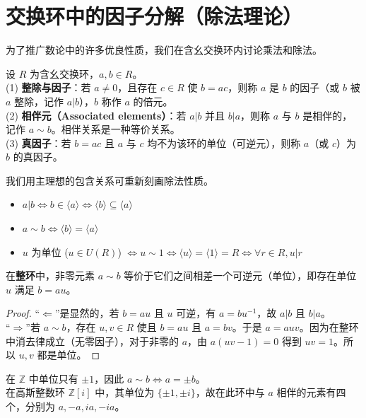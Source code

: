 \documentclass[11pt]{article}
\begin{document}
\section{交换环中的因子分解（除法理论）}

为了推广数论中的许多优良性质，我们在含幺交换环内讨论乘法和除法。
\begin{cndefinition}
设 $R$ 为含幺交换环，$a, b \in R$。\\
(1) \textbf{整除与因子}：若 $a \neq 0$，且存在 $c \in R$ 使 $b=ac$，则称 $a$ 是 $b$ 的因子（或 $b$ 被 $a$ 整除，记作 $a|b$），$b$ 称作 $a$ 的倍元。\\
(2) \textbf{相伴元（Associated elements）}：若 $a|b$ 并且 $b|a$，则称 $a$ 与 $b$ 是相伴的，记作 $a \sim b$。相伴关系是一种等价关系。\\
(3) \textbf{真因子}：若 $b=ac$ 且 $a$ 与 $c$ 均不为该环的单位（可逆元），则称 $a$（或 $c$）为 $b$ 的真因子。
\end{cndefinition}

\begin{cnproperty}[整除关系与理想的对应]
我们用主理想的包含关系可重新刻画除法性质。
\begin{itemize}
    \item $a | b \iff b \in \langle a \rangle \iff \langle b \rangle \subseteq \langle a \rangle$ 
    \item $a \sim b \iff \langle b \rangle = \langle a \rangle$
    \item $u$ 为单位 ($u \in U(R)$) $\iff u \sim 1 \iff \langle u \rangle = \langle 1 \rangle = R \iff \forall r \in R, u|r$
\end{itemize}
\end{cnproperty}

\begin{cntheorem}
在\textbf{整环}中，非零元素 $a \sim b$ 等价于它们之间相差一个可逆元（单位），即存在单位 $u$ 满足 $b = au$。
\end{cntheorem}
\begin{proof}
“$\Leftarrow$”是显然的，若 $b = au$ 且 $u$ 可逆，有 $a = b u^{-1}$，故 $a|b$ 且 $b|a$。\\
“$\Rightarrow$”若 $a \sim b$，存在 $u, v \in R$ 使且 $b=au$ 且 $a=bv$。于是 $a = auv$。因为在整环中消去律成立（无零因子），对于非零的 $a$，由 $a(uv-1)=0$ 得到 $uv=1$。所以 $u, v$ 都是单位。
\end{proof}

\begin{cnexample}
在 $\mathbb{Z}$ 中单位只有 $\pm 1$，因此 $a \sim b \iff a = \pm b$。\\
在高斯整数环 $\mathbb{Z}[i]$ 中，其单位为 $\{\pm 1, \pm i\}$，故在此环中与 $a$ 相伴的元素有四个，分别为 $a, -a, ia, -ia$。
\end{cnexample}
\end{document}
